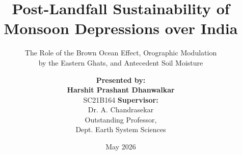 \documentclass[aspectratio=169,t,xcolor=table]{beamer}
\begin{document}
\title[Post-Landfall MD Sustainability]{Post-Landfall Sustainability
of Monsoon Depressions over India}
\subtitle{The Role of the Brown Ocean Effect, Orographic
Modulation\\by the Eastern Ghats, and Antecedent Soil Moisture}

\author[Harshit P. D.]{
  \footnotesize
  \hfill
  \begin{columns}
    \centering
    \textbf{Presented by:} \\
    \textbf{Harshit Prashant Dhanwalkar} \\
    SC21B164
    \centering
    \textbf{Supervisor:} \\
    Dr. A. Chandrasekar \\
    \small Outstanding Professor,  \\
    Dept. Earth System Sciences
  \end{columns}
  \hfill
}

\date{May 2026}
\frame[noframenumbering]{\titlepage}
\end{document}
